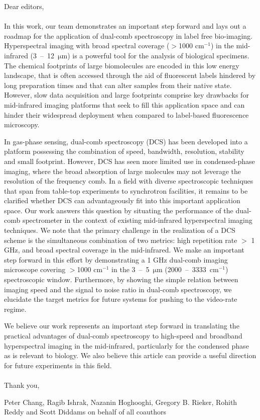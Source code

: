 \documentclass[12pt]{article}
\begin{document}
\noindent
Dear editors,
\\\\
In this work, our team demonstrates an important step forward and lays out a roadmap for the application of dual-comb spectroscopy in label free bio-imaging. Hyperspectral imaging with broad spectral coverage ($>$1000 \mbox{$\mathrm{cm^{-1}}$}) in the mid-infrared (\mbox{3 – 12 $\mathrm{\mu m}$}) is a powerful tool for the analysis of biological specimens. The chemical footprints of large biomolecules are encoded in this low energy landscape, that is often accessed through the aid of fluorescent labels hindered by long preparation times and that can alter samples from their native state. However, slow data acquisition and large footprints comprise key drawbacks for mid-infrared imaging platforms that seek to fill this application space and can hinder their widespread deployment when compared to label-based fluorescence microscopy.

In gas-phase sensing, dual-comb spectroscopy (DCS) has been developed into a platform possessing the combination of speed, bandwidth, resolution, stability and small footprint. However, DCS has seen more limited use in condensed-phase imaging, where the broad absorption of large molecules may not leverage the resolution of the frequency comb. In a field with diverse spectroscopic techniques that span from table-top experiments to synchrotron facilities, it remains to be clarified whether DCS can advantageously fit into this important application space. Our work answers this question by situating the performance of the dual-comb spectrometer in the context of existing mid-infrared hyperspectral imaging techniques. We note that the primary challenge in the realization of a DCS scheme is the simultaneous combination of two metrics: high repetition rate $>$ 1 GHz, and broad spectral coverage in the mid-infrared. We make an important step forward in this effort by demonstrating a 1 GHz dual-comb imaging microscope covering $>$1000 \mbox{$\mathrm{cm^{-1}}$} in the \mbox{3 – 5 $\mathrm{\mu m}$} \mbox{(2000 – 3333 \mbox{$\mathrm{cm^{-1}}$})} spectroscopic window. Furthermore, by showing the simple relation between imaging speed and the signal to noise ratio in dual-comb spectroscopy, we elucidate the target metrics for future systems for pushing to the video-rate regime.

We believe our work represents an important step forward in translating the practical advantages of dual-comb spectroscopy to high-speed and broadband hyperspectral imaging in the mid-infrared, particularly for the condensed phase as is relevant to biology. We also believe this article can provide a useful direction for future experiments in this field.
\\\\
Thank you,

Peter Chang, Ragib Ishrak, Nazanin Hoghooghi, Gregory B. Rieker, Rohith Reddy and Scott Diddams on behalf of all coauthors
\end{document}
